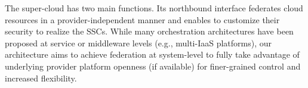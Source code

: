\documentclass{sig-alternate}
\begin{document}
The super-cloud has two main functions.
Its northbound interface federates cloud resources in a provider-independent manner and enables to customize their security to realize the SSCs. While many orchestration architectures have been proposed at service or middleware levels (e.g., multi-IaaS platforms), our architecture aims to achieve federation at system-level to fully take advantage of underlying provider platform openness (if available) for finer-grained control and increased flexibility.

\end{document}
